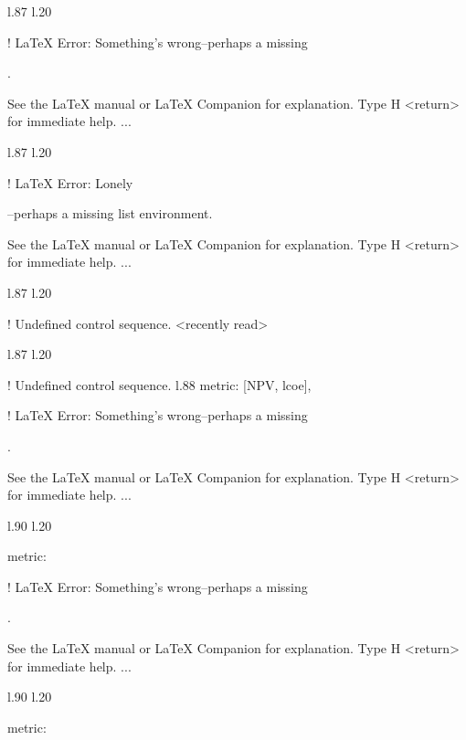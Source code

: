 {{{{{{{{{{{l.87 l.20     \item \xmlNode
                            

! LaTeX Error: Something's wrong--perhaps a missing \item.

See the LaTeX manual or LaTeX Companion for explanation.
Type  H <return>  for immediate help.
 ...                                              
                                                  
l.87 l.20     \item \xmlNode
                            

! LaTeX Error: Lonely \item--perhaps a missing list environment.

See the LaTeX manual or LaTeX Companion for explanation.
Type  H <return>  for immediate help.
 ...                                              
                                                  
l.87 l.20     \item \xmlNode
                            
! Undefined control sequence.
<recently read> \xmlNode 
                         
l.87 l.20     \item \xmlNode
                            
! Undefined control sequence.
l.88                        {metric}: \xmlDesc
                                              {[NPV, lcoe]},

! LaTeX Error: Something's wrong--perhaps a missing \item.

See the LaTeX manual or LaTeX Companion for explanation.
Type  H <return>  for immediate help.
 ...                                              
                                                  
l.90 l.20     \item \xmlNode
                            {metric}: \xmlDesc

! LaTeX Error: Something's wrong--perhaps a missing \item.

See the LaTeX manual or LaTeX Companion for explanation.
Type  H <return>  for immediate help.
 ...                                              
                                                  
l.90 l.20     \item \xmlNode
                            {metric}: \xmlDesc

}}}}}}}}}}}
